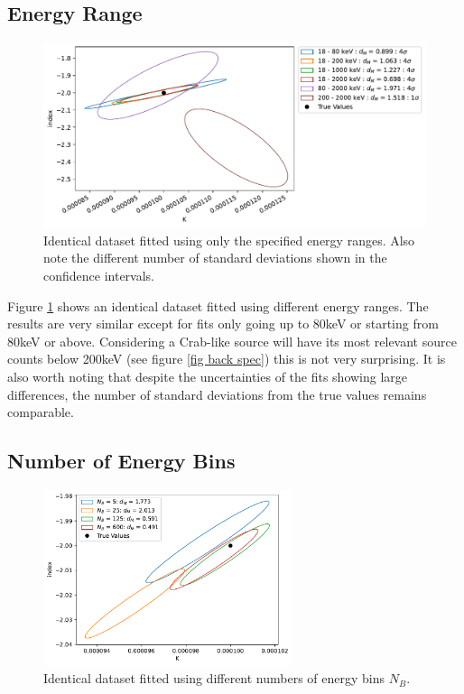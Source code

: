 \documentclass{report}
\begin{document}
\FloatBarrier

\subsection{Energy Range}

\begin{figure}[h]
  \centering
  \includegraphics[width=\textwidth]{Images/Pure_Simulation/combined_plot_energy_range.pdf}
  \caption{Identical dataset fitted using only the specified energy ranges. Also note the different number of standard deviations shown in the confidence intervals.}
  \label{fig energy range}
\end{figure}

Figure \ref{fig energy range} shows an identical dataset fitted using different energy ranges. The results are very similar except for fits only going up to 80keV or starting from 80keV or above. Considering a Crab-like source will have its most relevant source counts below 200keV (see figure \ref{fig back spec}) this is not very surprising. It is also worth noting that despite the uncertainties of the fits showing large differences, the number of standard deviations from the true values remains comparable. 




\subsection{Number of Energy Bins}

\begin{figure}[h]
  \centering
  \includegraphics[width=0.65\textwidth]{Images/Pure_Simulation/combined_plot_num_e_bins.pdf}
  \caption{Identical dataset fitted using different numbers of energy bins $N_B$.}
  \label{fig num bins}
\end{figure}
\end{document}
